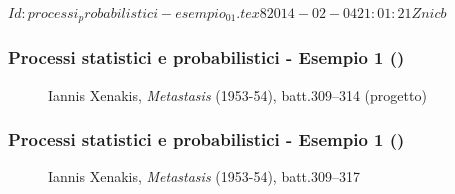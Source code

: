 %
%
\svnInfo $Id: processi_probabilistici-esempio_01.tex 8 2014-02-04 21:01:21Z nicb $

\setcounter{ms}{0}
\begin{frame}
    \frametitle{Processi statistici e probabilistici - Esempio 1 ()}

    \begin{center}
        \begin{figure}
            \caption{Iannis Xenakis, \emph{Metastasis} (1953-54), batt.309--314 (progetto)}
        \end{figure}
    \end{center}

\end{frame}

\begin{frame}
    \frametitle{Processi statistici e probabilistici - Esempio 1 ()}

    \begin{center}
        \begin{figure}
            \caption{Iannis Xenakis, \emph{Metastasis} (1953-54), batt.309--317}
        \end{figure}
    \end{center}

\end{frame}
